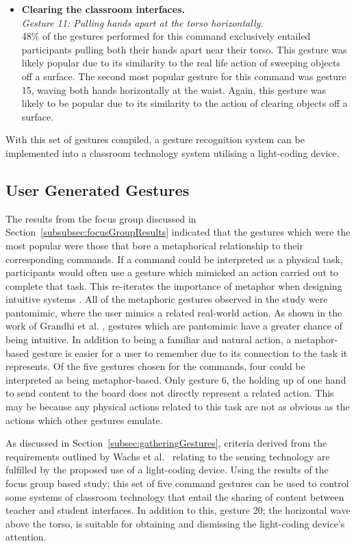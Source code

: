 \documentclass[link]{IWCOMP}
\begin{document}
\begin{itemize}
\item \textbf{Clearing the classroom interfaces.}\\
\textit{Gesture 11: Pulling hands apart at the torso horizontally.}\\
48\% of the gestures performed for this command exclusively entailed participants pulling both their hands apart near their torso.
This gesture was likely popular due to its similarity to the real life action of sweeping objects off a surface.
The second most popular gesture for this command was gesture 15, waving both hands horizontally at the waist.
Again, this gesture was likely to be popular due to its similarity to the action of clearing objects off a surface.\\
\end{itemize}

With this set of gestures compiled, a gesture recognition system can be implemented into a classroom technology system utilising a light-coding device.

\subsection{User Generated Gestures}
\label{subsec:userGeneratedGestures}

The results from the focus group discussed in Section~\ref{subsubsec:focusGroupResults} indicated that the gestures which were the most popular were those that bore a metaphorical relationship to their corresponding commands.
If a command could be interpreted as a physical task, participants would often use a gesture which mimicked an action carried out to complete that task.
This re-iterates the importance of metaphor when designing intuitive systems \cite{Wang2008}.
All of the metaphoric gestures observed in the study were pantomimic, where the user mimics a related real-world action.
As shown in the work of Grandhi et al. \citeyearpar{Grandhi2011}, gestures which are pantomimic have a greater chance of being intuitive.
In addition to being a familiar and natural action, a metaphor-based gesture is easier for a user to remember due to its connection to the task it represents.
Of the five gestures chosen for the commands, four could be interpreted as being metaphor-based.
Only gesture 6, the holding up of one hand to send content to the board does not directly represent a related action.
This may be because any physical actions related to this task are not as obvious as the actions which other gestures emulate.

As discussed in Section~\ref{subsec:gatheringGestures}, criteria derived from the requirements outlined by Wachs et al.~\citeyearpar{Wachs2011} relating to the sensing technology are fulfilled by the proposed use of a light-coding device.
Using the results of the focus group based study; this set of five command gestures can be used to control some systems of classroom technology that entail the sharing of content between teacher and student interfaces.
In addition to this, gesture 20; the horizontal wave above the torso, is suitable for obtaining and dismissing the light-coding device's attention.
\end{document}
